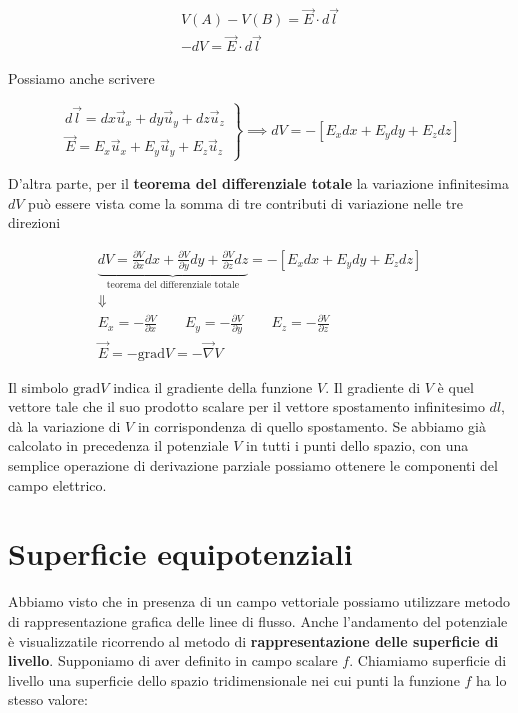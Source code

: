 \begin{gather*}
	V(A)-V(B) = \vec{E} \cdot d\vec{l} \\
	\boxed{-dV = \vec{E} \cdot d\vec{l}}
\end{gather*}

Possiamo anche scrivere

\[
	\left. \begin{array}{r}
	 	d\vec{l} =dx\vec{u}_x+dy\vec{u}_y+dz\vec{u}_z \\
		\vec{E} = E_x\vec{u}_x + E_y\vec{u}_y + E_z\vec{u}_z
	\end{array} \right\} \implies dV = - [E_xdx + E_ydy + E_zdz]
\]

D'altra parte, per il \textbf{teorema del differenziale totale} la variazione infinitesima $dV$ può essere vista come la somma di tre contributi di variazione nelle tre direzioni

\begin{gather*}
	\underbrace{dV=\frac{\partial V}{\partial x} dx + \frac{\partial V}{\partial y} dy + \frac{\partial V}{\partial z} dz}_{\text{teorema del differenziale totale}} = - [E_xdx + E_ydy + E_zdz] \\
	\Downarrow \\
	E_x = -\frac{\partial V}{\partial x} \qquad E_y = -\frac{\partial V}{\partial y} \qquad E_z = -\frac{\partial V}{\partial z} \\
	\boxed{\vec{E} = - \text{grad}V = - \vec{\nabla} V}
\end{gather*}

Il simbolo $ \text{grad}V $ indica il gradiente della funzione $V$.
Il gradiente di $V$ è quel vettore tale che il suo prodotto scalare per il vettore spostamento infinitesimo $ dl $, dà la variazione di $V$ in corrispondenza di quello spostamento.
Se abbiamo già calcolato in precedenza il potenziale $V$ in tutti i punti dello spazio, con una semplice operazione di derivazione parziale possiamo ottenere le componenti del campo elettrico.

\section{Superficie equipotenziali}

Abbiamo visto che in presenza di un campo vettoriale possiamo utilizzare metodo di rappresentazione grafica delle linee di flusso. Anche l'andamento del potenziale è visualizzatile ricorrendo al metodo di \textbf{rappresentazione delle superficie di livello}.
Supponiamo di aver definito in campo scalare $f$. Chiamiamo superficie di livello una superficie dello spazio tridimensionale nei cui punti la funzione $f$ ha lo stesso valore:

